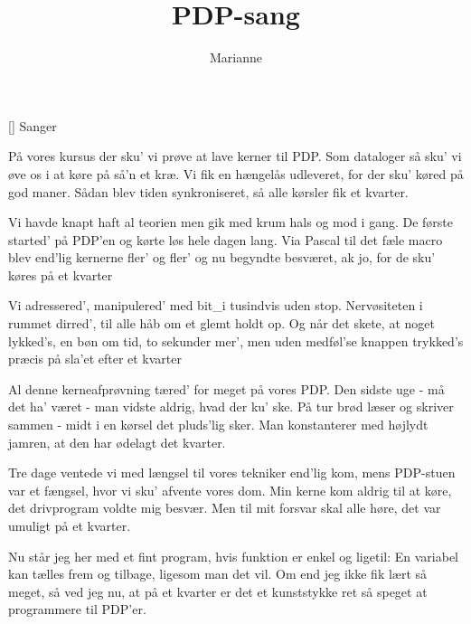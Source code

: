 \documentclass[a4paper,11pt]{article}
\title{PDP-sang}
\author{Marianne}
\begin{document}
\maketitle

\begin{roles}
[] Sanger
\end{roles}

\begin{song}
På vores kursus der sku' vi prøve
at lave kerner til PDP.
Som dataloger så sku' vi øve
os i at køre på så'n et kræ.
Vi fik en hængelås udleveret,
for der sku' køred på god maner.
Sådan blev tiden synkroniseret,
så alle kørsler fik et kvarter.

Vi havde knapt haft al teorien
men gik med krum hals og mod i gang.
De første started' på PDP'en
og kørte løs hele dagen lang.
Via Pascal til det fæle macro
blev end'lig kernerne fler' og fler'
og nu begyndte besværet, ak jo,
for de sku' køres på et kvarter

Vi adressered', manipulered'
med bit\_i tusindvis uden stop.
Nervøsiteten i rummet dirred',
til alle håb om et glemt holdt op.
Og når det skete, at noget lykked's,
en bøn om tid, to sekunder mer',
men uden medføl'se knappen trykked's
præcis på sla'et efter et kvarter

Al denne kerneafprøvning tæred'
for meget på vores PDP.
Den sidste uge - må det ha' været -
man vidste aldrig, hvad der ku' ske.
På tur brød læser og skriver sammen -
midt i en kørsel det pluds'lig sker.
Man konstanterer med højlydt jamren,
at den har ødelagt det kvarter.

Tre dage ventede vi med længsel
til vores tekniker end'lig kom,
mens PDP-stuen var et fængsel,
hvor vi sku' afvente vores dom.
Min kerne kom aldrig til at køre,
det drivprogram voldte mig besvær.
Men til mit forsvar skal alle høre,
det var umuligt på et kvarter.

Nu står jeg her med et fint program,
hvis funktion er enkel og ligetil:
En variabel kan tælles frem
og tilbage, ligesom man det vil.
Om end jeg ikke fik lært så meget,
så ved jeg nu, at på et kvarter
er det et kunststykke ret så speget
at programmere til PDP'er.
\end{song}
\end{document}
